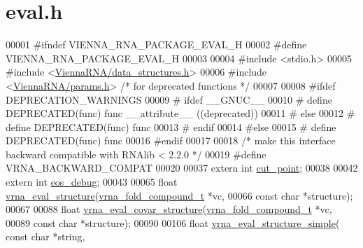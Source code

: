 \hypertarget{eval_8h_source}{}\section{eval.\+h}
\label{eval_8h_source}

\begin{DoxyCode}
00001 \textcolor{preprocessor}{#ifndef VIENNA\_RNA\_PACKAGE\_EVAL\_H}
00002 \textcolor{preprocessor}{#define VIENNA\_RNA\_PACKAGE\_EVAL\_H}
00003 
00004 \textcolor{preprocessor}{#include <stdio.h>}
00005 \textcolor{preprocessor}{#include <\hyperlink{data__structures_8h}{ViennaRNA/data\_structures.h}>}
00006 \textcolor{preprocessor}{#include <\hyperlink{params_8h}{ViennaRNA/params.h}>}   \textcolor{comment}{/* for deprecated functions */}
00007 
00008 \textcolor{preprocessor}{#ifdef DEPRECATION\_WARNINGS}
00009 \textcolor{preprocessor}{# ifdef \_\_GNUC\_\_}
00010 \textcolor{preprocessor}{#  define DEPRECATED(func) func \_\_attribute\_\_ ((deprecated))}
00011 \textcolor{preprocessor}{# else}
00012 \textcolor{preprocessor}{#  define DEPRECATED(func) func}
00013 \textcolor{preprocessor}{# endif}
00014 \textcolor{preprocessor}{#else}
00015 \textcolor{preprocessor}{# define DEPRECATED(func) func}
00016 \textcolor{preprocessor}{#endif}
00017 
00018 \textcolor{comment}{/* make this interface backward compatible with RNAlib < 2.2.0 */}
00019 \textcolor{preprocessor}{#define VRNA\_BACKWARD\_COMPAT}
00020 
00037 \textcolor{keyword}{extern}  \textcolor{keywordtype}{int} \hyperlink{group__eval_gab9b2c3a37a5516614c06d0ab54b97cda}{cut\_point};
00038 
00042 \textcolor{keyword}{extern}  \textcolor{keywordtype}{int} \hyperlink{group__eval_ga567530678f6260a1a649a5beca5da4c5}{eos\_debug};
00043 
00065 \textcolor{keywordtype}{float} \hyperlink{group__eval_ga58f199f1438d794a265f3b27fc8ea631}{vrna\_eval\_structure}(\hyperlink{group__fold__compound_structvrna__fc__s}{vrna\_fold\_compound\_t} *vc,
00066                           \textcolor{keyword}{const} \textcolor{keywordtype}{char} *structure);
00067 
00088 \textcolor{keywordtype}{float} \hyperlink{group__eval_ga6cea75c0eb9857fb59172be54cab09e0}{vrna\_eval\_covar\_structure}(\hyperlink{group__fold__compound_structvrna__fc__s}{vrna\_fold\_compound\_t} *vc,
00089                                 \textcolor{keyword}{const} \textcolor{keywordtype}{char} *structure);
00090 
00106 \textcolor{keywordtype}{float} \hyperlink{group__eval_gab6930f446d04761454d033680fbf7909}{vrna\_eval\_structure\_simple}( \textcolor{keyword}{const} \textcolor{keywordtype}{char} *\textcolor{keywordtype}{string},

\end{DoxyCode}
